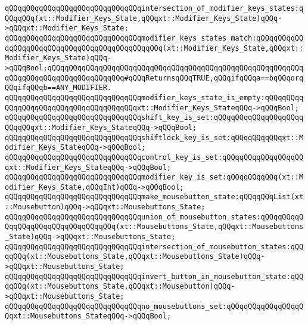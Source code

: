 \verb|qQQqqQQqqQQqqQQqqQQqqQQqqQQqqQQqintersection_of_modifier_keys_states:qQQqqQQq(xt::Modifier_Keys_State,qQQqxt::Modifier_Keys_State)qQQq->qQQqxt::Modifier_Keys_State;|\newline
\newline
\verb|qQQqqQQqqQQqqQQqqQQqqQQqqQQqqQQqmodifier_keys_states_match:qQQqqQQqqQQqqQQqqQQqqQQqqQQqqQQqqQQqqQQqqQQqqQQq(xt::Modifier_Keys_State,qQQqxt::Modifier_Keys_State)qQQq->qQQqBool;qQQqqQQqqQQqqQQqqQQqqQQqqQQqqQQqqQQqqQQqqQQqqQQqqQQqqQQqqQQqqQQqqQQqqQQqqQQqqQQqqQQqqQQq#qQQqReturnsqQQqTRUE,qQQqifqQQqa==bqQQqorqQQqifqQQqb==ANY_MODIFIER.|\newline
\verb|qQQqqQQqqQQqqQQqqQQqqQQqqQQqqQQqmodifier_keys_state_is_empty:qQQqqQQqqQQqqQQqqQQqqQQqqQQqqQQqqQQqqQQqxt::Modifier_Keys_StateqQQq->qQQqBool;|\newline
\newline
\verb|qQQqqQQqqQQqqQQqqQQqqQQqqQQqqQQqshift_key_is_set:qQQqqQQqqQQqqQQqqQQqqQQqqQQqxt::Modifier_Keys_StateqQQq->qQQqBool;|\newline
\verb|qQQqqQQqqQQqqQQqqQQqqQQqqQQqqQQqshiftlock_key_is_set:qQQqqQQqqQQqxt::Modifier_Keys_StateqQQq->qQQqBool;|\newline
\verb|qQQqqQQqqQQqqQQqqQQqqQQqqQQqqQQqcontrol_key_is_set:qQQqqQQqqQQqqQQqqQQqxt::Modifier_Keys_StateqQQq->qQQqBool;|\newline
\verb|qQQqqQQqqQQqqQQqqQQqqQQqqQQqqQQqmodifier_key_is_set:qQQqqQQqqQQq(xt::Modifier_Keys_State,qQQqInt)qQQq->qQQqBool;|\newline
\newline
\verb|qQQqqQQqqQQqqQQqqQQqqQQqqQQqqQQqmake_mousebutton_state:qQQqqQQqList(xt::Mousebutton)qQQq->qQQqxt::Mousebuttons_State;|\newline
\newline
\verb|qQQqqQQqqQQqqQQqqQQqqQQqqQQqqQQqunion_of_mousebutton_states:qQQqqQQqqQQqqQQqqQQqqQQqqQQqqQQqqQQq(xt::Mousebuttons_State,qQQqxt::Mousebuttons_State)qQQq->qQQqxt::Mousebuttons_State;|\newline
\verb|qQQqqQQqqQQqqQQqqQQqqQQqqQQqqQQqintersection_of_mousebutton_states:qQQqqQQq(xt::Mousebuttons_State,qQQqxt::Mousebuttons_State)qQQq->qQQqxt::Mousebuttons_State;|\newline
\newline
\verb|qQQqqQQqqQQqqQQqqQQqqQQqqQQqqQQqinvert_button_in_mousebutton_state:qQQqqQQq(xt::Mousebuttons_State,qQQqxt::Mousebutton)qQQq->qQQqxt::Mousebuttons_State;|\newline
\newline
\verb|qQQqqQQqqQQqqQQqqQQqqQQqqQQqqQQqno_mousebuttons_set:qQQqqQQqqQQqqQQqqQQqxt::Mousebuttons_StateqQQq->qQQqBool;|\newline
